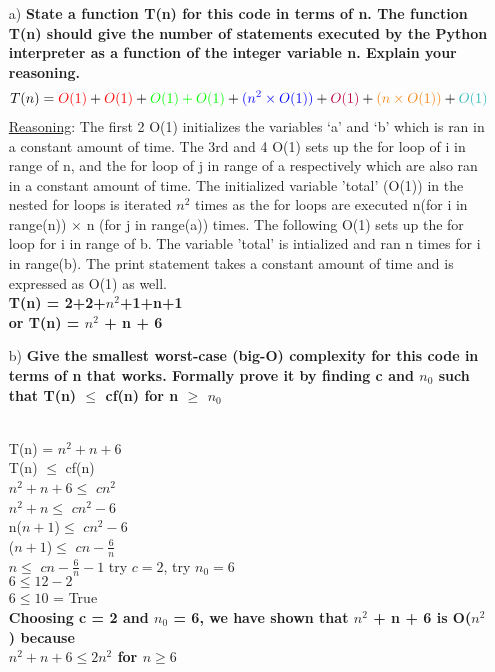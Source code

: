 \documentclass[11pt]{article}
\begin{document}
\begin{itemize}
\item[a)] {\bf State a function T(n) for this code in terms of n. The function T(n) should give the number of statements executed by the Python interpreter as a function of the integer variable n. Explain your reasoning.}
\\
\begin{align*}
T(n) &=  {\color{red}O(1)}+{\color{red}O(1)}+{\color{green}O(1)+O(1)}+{\color{blue}(n^{2}\times O(1))}+{\color{purple}O(1)}+{\color{BurntOrange}(n\times O(1))}+{\color{Aquamarine}O(1)}
\end{align*}
\underline{Reasoning}: {\color{red}The first 2 O(1) initializes the variables ‘a’ and ‘b’ which is ran in a constant amount of time.} {\color{green}The 3rd and 4 O(1) sets up  the for loop of i in range of n, and the for loop of j in range of a respectively which are also ran in a constant amount of time.} {\color{blue} The initialized variable 'total' (O(1)) in the nested for loops is iterated $n^2$ times as the for loops are executed n(for i in range(n)) $\times$ n (for j in range(a)) times. } {\color{purple}The following O(1) sets up the for loop for i in range of b}. {\color{BurntOrange}The variable 'total' is intialized and ran n times for i in range(b).}  {\color{Aquamarine}The print statement takes a constant amount of time and is expressed as O(1) as well.} \\
{\bf T(n) = 2+2+$n^2$+1+n+1}\\
{\bf or T(n) = $n^2$ + n + 6}\\

\item[b)] {\bf Give the smallest worst-case (big-O) complexity for this code in terms of n that works. Formally prove it by finding c and $n_{0}$ such that T(n) $\leq$ cf(n) for n $\geq$ $n_{0}$}\\\

T(n) = {$n^2+  n+6$}\\ 
T(n) $\leq$ cf(n)\\
{$n^2+ n+6$}$\leq$ $cn^2$ \\
{$n^2+ n$}$\leq$ $cn^2-6$\\
{n($n+ 1$)}$\leq$ $cn^2-6$\\
{($n+ 1$)}$\leq$ $cn-\frac{6}{n}$\\
{$n$}$\leq$ $cn-\frac{6}{n}-1$ \quad\quad\quad try $c = 2$, try $n_{0}=6$\\
$6 \leq 12 - 2$\\
$6 \leq 10$ = True\\
{\bf \color{PineGreen} Choosing c = 2 and $n_{0}$ = 6, we have shown that $n^2$ + n + 6 is O($n^2$) because}\\
{\bf \color{PineGreen}$n^2+n+6 \leq 2n^2$ for $n \geq 6$}


\end{itemize}
\end{document}
